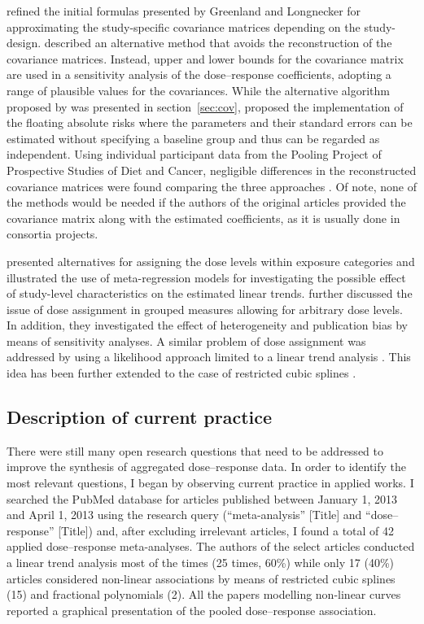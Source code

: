 \documentclass[11pt,a4paper,twoside,openany]{book}\usepackage{knitr}
\begin{document}
{{\cite{orsini2006generalized} refined the initial formulas presented by Greenland and Longnecker for approximating the study-specific covariance matrices depending on the study-design. \cite{berrington2003generalized} described an alternative method that avoids the reconstruction of the covariance matrices. Instead, upper and lower bounds for the covariance matrix are used in a sensitivity analysis of the dose--response coefficients, adopting a range of plausible values for the covariances. While the alternative algorithm proposed by \cite{hamling2008facilitating} was presented in section~\ref{sec:cov}, \cite{easton1991floating} proposed the implementation of the floating absolute risks where the parameters and their standard errors can be estimated without specifying a baseline group and thus can be regarded as independent. Using individual participant data from the Pooling Project of Prospective Studies of Diet and Cancer, negligible differences in the reconstructed covariance matrices were found comparing the three approaches \citep{orsini2011meta}. Of note, none of the methods would be needed if the authors of the original articles provided the covariance matrix along with the estimated coefficients, as it is usually done in consortia projects.

\cite{berlin1993meta} presented alternatives for assigning the dose levels within exposure categories and illustrated the use of meta-regression models for investigating the possible effect of study-level characteristics on the estimated linear trends. \cite{shi2004meta} further discussed the issue of dose assignment in grouped measures allowing for arbitrary dose levels. In addition, they investigated the effect of heterogeneity and publication bias by means of sensitivity analyses. A similar problem of dose assignment was addressed by using a likelihood approach limited to a linear trend analysis \citep{takahashi2010assignment}. This idea has been further extended to the case of restricted cubic splines \citep{takahashi2013cubic}.

\subsection{Description of current practice}

There were still many open research questions that need to be addressed to improve the synthesis of aggregated dose--response data. In order to identify the most relevant questions, I began by observing current practice in applied works.
I searched the PubMed database for articles published between January 1, 2013 and April 1, 2013 using the research query (``meta-analysis'' [Title] and ``dose--response'' [Title]) and, after excluding irrelevant articles, I found a total of 42 applied dose--response meta-analyses. The authors of the select articles conducted a linear trend analysis most of the times (25 times, 60\%) while only 17 (40\%) articles considered non-linear associations by means of restricted cubic splines (15) and fractional polynomials (2). All the papers modelling non-linear curves reported a graphical presentation of the pooled dose--response association.

}}
\end{document}

